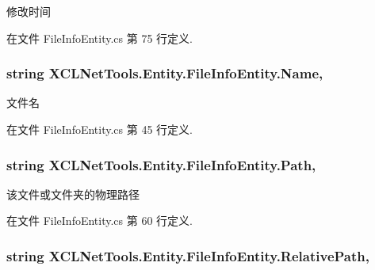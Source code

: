 修改时间 



在文件 File\-Info\-Entity.\-cs 第 75 行定义.

\hypertarget{class_x_c_l_net_tools_1_1_entity_1_1_file_info_entity_a15a2bb6c738c32250f00604b6636cae4}{
\subsubsection[{Name}]{\setlength{\rightskip}{0pt plus 5cm}string X\-C\-L\-Net\-Tools.\-Entity.\-File\-Info\-Entity.\-Name\hspace{0.3cm}{\ttfamily [get]}, {\ttfamily [set]}}}\label{class_x_c_l_net_tools_1_1_entity_1_1_file_info_entity_a15a2bb6c738c32250f00604b6636cae4}


文件名 



在文件 File\-Info\-Entity.\-cs 第 45 行定义.

\hypertarget{class_x_c_l_net_tools_1_1_entity_1_1_file_info_entity_a67f485c1a1af6205351305756d515e98}{
\subsubsection[{Path}]{\setlength{\rightskip}{0pt plus 5cm}string X\-C\-L\-Net\-Tools.\-Entity.\-File\-Info\-Entity.\-Path\hspace{0.3cm}{\ttfamily [get]}, {\ttfamily [set]}}}\label{class_x_c_l_net_tools_1_1_entity_1_1_file_info_entity_a67f485c1a1af6205351305756d515e98}


该文件或文件夹的物理路径 



在文件 File\-Info\-Entity.\-cs 第 60 行定义.

\hypertarget{class_x_c_l_net_tools_1_1_entity_1_1_file_info_entity_a795982d186fa2d1ef0e3fb51705f36b2}{
\subsubsection[{Relative\-Path}]{\setlength{\rightskip}{0pt plus 5cm}string X\-C\-L\-Net\-Tools.\-Entity.\-File\-Info\-Entity.\-Relative\-Path\hspace{0.3cm}{\ttfamily [get]}, {\ttfamily [set]}}}\label{class_x_c_l_net_tools_1_1_entity_1_1_file_info_entity_a795982d186fa2d1ef0e3fb51705f36b2}


